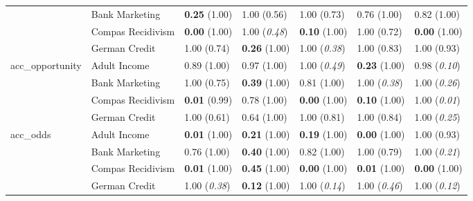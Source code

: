 \begin{tabular}{lllllll}
 & Bank Marketing & \textbf{0.25} (1.00) & 1.00 (0.56) & 1.00 (0.73) & 0.76 (1.00) & 0.82 (1.00) \\
 & Compas Recidivism & \textbf{0.00} (1.00) & 1.00 (\textit{0.48}) & \textbf{0.10} (1.00) & 1.00 (0.72) & \textbf{0.00} (1.00) \\
 & German Credit & 1.00 (0.74) & \textbf{0.26} (1.00) & 1.00 (\textit{0.38}) & 1.00 (0.83) & 1.00 (0.93) \\
\cline{1-7}
\multirow[t]{4}{*}{acc_opportunity} & Adult Income & 0.89 (1.00) & 0.97 (1.00) & 1.00 (\textit{0.49}) & \textbf{0.23} (1.00) & 0.98 (\textit{0.10}) \\
 & Bank Marketing & 1.00 (0.75) & \textbf{0.39} (1.00) & 0.81 (1.00) & 1.00 (\textit{0.38}) & 1.00 (\textit{0.26}) \\
 & Compas Recidivism & \textbf{0.01} (0.99) & 0.78 (1.00) & \textbf{0.00} (1.00) & \textbf{0.10} (1.00) & 1.00 (\textit{0.01}) \\
 & German Credit & 1.00 (0.61) & 0.64 (1.00) & 1.00 (0.81) & 1.00 (0.84) & 1.00 (\textit{0.25}) \\
\cline{1-7}
\multirow[t]{4}{*}{acc_odds} & Adult Income & \textbf{0.01} (1.00) & \textbf{0.21} (1.00) & \textbf{0.19} (1.00) & \textbf{0.00} (1.00) & 1.00 (0.93) \\
 & Bank Marketing & 0.76 (1.00) & \textbf{0.40} (1.00) & 0.82 (1.00) & 1.00 (0.79) & 1.00 (\textit{0.21}) \\
 & Compas Recidivism & \textbf{0.01} (1.00) & \textbf{0.45} (1.00) & \textbf{0.00} (1.00) & \textbf{0.01} (1.00) & \textbf{0.00} (1.00) \\
 & German Credit & 1.00 (\textit{0.38}) & \textbf{0.12} (1.00) & 1.00 (\textit{0.14}) & 1.00 (\textit{0.46}) & 1.00 (\textit{0.12}) \\
\cline{1-7}
\bottomrule
\end{tabular}
